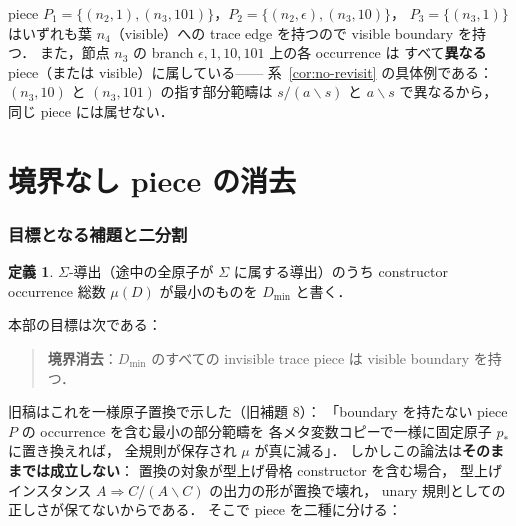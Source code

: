 \documentclass[paper=a4,fontsize=10pt,jafontscale=0.92]{jlreq}
\theoremstyle{plain}
\theoremstyle{definition}
\newtheorem{definition}[theorem]{定義}
\theoremstyle{remark}
\newcommand{\Sig}{\Sigma}
\newcommand{\bs}{\backslash}
\newcommand{\Dmin}{D_{\min}}
\begin{document}
\begin{verifybox}
\begin{center}
\end{center}

\smallskip
piece $P_1=\{(n_2,1),(n_3,101)\}$，$P_2=\{(n_2,\epsilon),(n_3,10)\}$，
$P_3=\{(n_3,1)\}$ はいずれも葉 $n_4$（visible）への trace edge を持つので
visible boundary を持つ．
また，節点 $n_3$ の branch $\epsilon,1,10,101$ 上の各 occurrence は
すべて\textbf{異なる} piece（または visible）に属している——
系~\ref{cor:no-revisit} の具体例である：
$(n_3,10)$ と $(n_3,101)$ の指す部分範疇は $s/(a\bs s)$ と $a\bs s$ で異なるから，
同じ piece には属せない．
\end{verifybox}

\part{境界なし piece の消去}
\label{sec:boundary}

\section{目標となる補題と二分割}

\begin{definition}
$\Sig$-導出（途中の全原子が $\Sig$ に属する導出）のうち
constructor occurrence 総数 $\mu(D)$ が最小のものを $\Dmin$ と書く．
\end{definition}

本部の目標は次である：

\begin{quote}
\textbf{境界消去}：$\Dmin$ のすべての invisible trace piece は
visible boundary を持つ．
\end{quote}

旧稿はこれを一様原子置換で示した（旧補題 8）：
「boundary を持たない piece $P$ の occurrence を含む最小の部分範疇を
各メタ変数コピーで一様に固定原子 $p_\ast$ に置き換えれば，
全規則が保存され $\mu$ が真に減る」．
しかしこの論法は\textbf{そのままでは成立しない}：
置換の対象が型上げ骨格 constructor を含む場合，
型上げインスタンス $A \Rightarrow C/(A\bs C)$ の出力の形が置換で壊れ，
unary 規則としての正しさが保てないからである．
そこで piece を二種に分ける：
\end{document}
